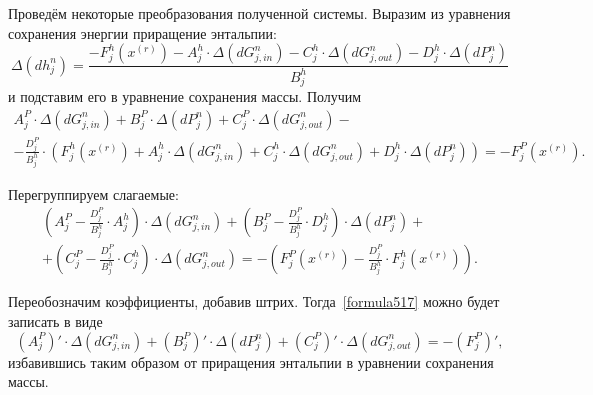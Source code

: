 Проведём некоторые преобразования полученной системы. Выразим из уравнения сохранения энергии приращение энтальпии:
\begin{equation}
\label{formula515}
\Delta(dh_j^n)=\frac{-F_j^h(x^{(r)})-A_j^h \cdot \Delta(dG_{j,in}^n)-C_j^h \cdot \Delta(dG_{j,out}^n)-D_j^h \cdot \Delta(dP_j^n)}{B_j^h}
\end{equation}
и подставим его в уравнение сохранения массы. Получим
\begin{eqnarray}
\label{formula516}
A_j^P \cdot \Delta(dG_{j,in}^n)+B_j^P \cdot \Delta(dP_j^n) + C_j^P \cdot \Delta(dG_{j,out}^n) - \nonumber ~\\
- \frac{D_j^P}{B_j^h} \cdot \left(F_j^h(x^{(r)})+A_j^h \cdot \Delta(dG_{j,in}^n)+C_j^h \cdot \Delta(dG_{j,out}^n)+D_j^h \cdot \Delta(dP_j^n)\right)=-F_j^P(x^{(r)}).	
\end{eqnarray}

Перегруппируем слагаемые:
\begin{eqnarray}
\label{formula517}
\left(A_j^P - \frac{D_j^P}{B_j^h} \cdot A_j^h \right) \cdot \Delta(dG_{j,in}^n) + \left(B_j^P - \frac{D_j^P}{B_j^h} \cdot D_j^h   \right) \cdot \Delta(dP_j^n) + \nonumber ~\\
+ \left(C_j^P - \frac{D_j^P}{B_j^h} \cdot C_j^h \right) \cdot \Delta(dG_{j,out}^n) = -\left(F_j^P(x^{(r)}) - \frac{D_j^P}{B_j^h} \cdot F_j^h(x^{(r)}) \right).	
\end{eqnarray}

Переобозначим коэффициенты, добавив штрих. Тогда~\eqref{formula517} можно будет записать в виде
\begin{equation}
\label{formula518}
\left(A_j^P \right)' \cdot \Delta(dG_{j,in}^n) + \left(B_j^P \right)' \cdot \Delta(dP_j^n) + \left(C_j^P \right)' \cdot \Delta(dG_{j,out}^n) = -\left(F_j^P \right)',
\end{equation}
избавившись таким образом от приращения энтальпии в уравнении сохранения массы.
\newpage 



















 